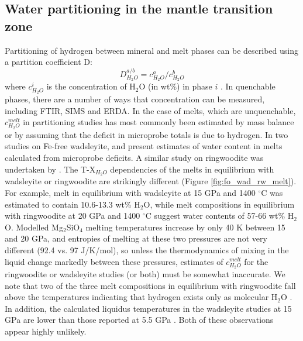 \documentclass[review]{elsarticle}
\begin{document}


\subsection{Water partitioning in the mantle transition zone}

Partitioning of hydrogen between mineral and melt phases can be described using a partition coefficient D:
\begin{equation}
  D^{a/b}_{H_2O} = c^a_{H_2O} / c^b_{H_2O}
\end{equation}
where $c^i_{H_2O}$ is the concentration of H$_2$O (in wt\%) in phase $i$ \citep{KB2006}. In quenchable phases, there are a number of ways that concentration can be measured, including FTIR, SIMS and ERDA. In the case of melts, which are unquenchable, $c^{melt}_{H_2O}$ in partitioning studies has most commonly been estimated by mass balance or by assuming that the deficit in microprobe totals is due to hydrogen. In two studies on Fe-free wadsleyite, \cite{DDFK2005} and \cite{LSOK2011} present estimates of water content in melts calculated from microprobe deficits. A similar study on ringwoodite was undertaken by \cite{OMY2000}. The T-X$_{H_2O}$ dependencies of the melts in equilibrium with wadsleyite or ringwoodite are strikingly different (Figure \ref{fig:fo_wad_rw_melt}). For example, melt in equilibrium with wadsleyite at 15 GPa and 1400 $^{\circ}$C was estimated to contain 10.6-13.3 wt\% H$_2$O, while melt compositions in equilibrium with ringwoodite at 20 GPa and 1400 $^{\circ}$C suggest water contents of 57-66 wt\% H$_2$O. Modelled Mg$_2$SiO$_4$ melting temperatures increase by only 40 K between 15 and 20 GPa, and entropies of melting at these two pressures are not very different (92.4 vs. 97 J/K/mol), so unless the thermodynamics of mixing in the liquid change markedly between these pressures, estimates of $c^{melt}_{H_2O}$ for the ringwoodite or wadsleyite studies (or both) must be somewhat inaccurate. We note that two of the three melt compositions in equilibrium with ringwoodite fall above the temperatures indicating that hydrogen exists only as molecular H$_2$O \citep{SS1985}. In addition, the calculated liquidus temperatures in the wadsleyite studies at 15 GPa are lower than those reported at 5.5 GPa \citep{Inoue1994}. Both of these observations appear highly unlikely.
\end{document}
